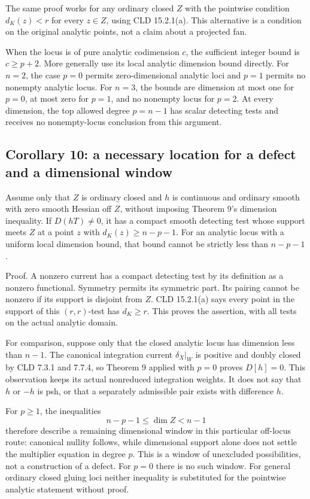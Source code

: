 \documentclass[11pt]{article}
\begin{document}
The same proof works for any ordinary closed \(Z\) with the pointwise condition \(d_K(z)<r\) for every \(z\in Z\), using CLD 15.2.1(a). This alternative is a condition on the original analytic points, not a claim about a projected fan.

When the locus is of pure analytic codimension \(c\), the sufficient integer bound is \(c\geq p+2\). More generally use its local analytic dimension bound directly. For \(n=2\), the case \(p=0\) permits zero-dimensional analytic loci and \(p=1\) permits no nonempty analytic locus. For \(n=3\), the bounds are dimension at most one for \(p=0\), at most zero for \(p=1\), and no nonempty locus for \(p=2\). At every dimension, the top allowed degree \(p=n-1\) has scalar detecting tests and receives no nonempty-locus conclusion from this argument.

\subsection{Corollary 10: a necessary location for a defect and a dimensional window}

Assume only that \(Z\) is ordinary closed and \(h\) is continuous and ordinary smooth with zero smooth Hessian off \(Z\), without imposing Theorem 9's dimension inequality. If \(D(hT)\ne0\), it has a compact smooth detecting test whose support meets \(Z\) at a point \(z\) with \(d_K(z)\geq n-p-1\). For an analytic locus with a uniform local dimension bound, that bound cannot be strictly less than \(n-p-1\).

Proof. A nonzero current has a compact detecting test by its definition as a nonzero functional. Symmetry permits its symmetric part. Its pairing cannot be nonzero if its support is disjoint from \(Z\). CLD 15.2.1(a) says every point in the support of this \((r,r)\)-test has \(d_K\geq r\). This proves the assertion, with all tests on the actual analytic domain.

For comparison, suppose only that the closed analytic locus has dimension less than \(n-1\). The canonical integration current \(\delta_X|_W\) is positive and doubly closed by CLD 7.3.1 and 7.7.4, so Theorem 9 applied with \(p=0\) proves \(D[h]=0\). This observation keeps its actual nonreduced integration weights. It does not say that \(h\) or \(-h\) is psh, or that a separately admissible pair exists with difference \(h\).

For \(p\geq1\), the inequalities
\[
 n-p-1\leq\dim Z<n-1
\]
therefore describe a remaining dimensional window in this particular off-locus route: canonical nullity follows, while dimensional support alone does not settle the multiplier equation in degree \(p\). This is a window of unexcluded possibilities, not a construction of a defect. For \(p=0\) there is no such window. For general ordinary closed gluing loci neither inequality is substituted for the pointwise analytic statement without proof.
\end{document}
